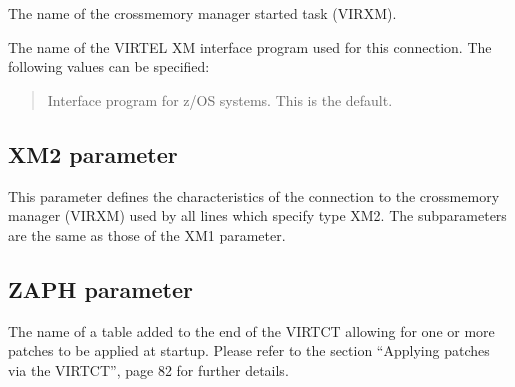\documentclass[letterpaper,10pt,english]{sphinxmanual}
\begin{document}
\sphinxAtStartPar
{} \sphinxhyphen{} The name of the cross\sphinxhyphen{}memory manager started task (VIRXM).

\sphinxAtStartPar
{} \sphinxhyphen{} The name of the VIRTEL XM interface program used for this connection. The following values can be specified:
\begin{quote}

\sphinxAtStartPar
{} \sphinxhyphen{} Interface program for z/OS systems. This is the default.
\end{quote}


\subsection{XM2 parameter}
\label{\detokenize{Installation_Guide:xm2-parameter}}
\begin{sphinxVerbatim}[commandchars=\\\{\}]
    
\PYG{p}{[}\PYG{p}{]}\PYG{p}{[}\PYG{p}{]}
\end{sphinxVerbatim}

\sphinxAtStartPar
This parameter defines the characteristics of the connection to the cross\sphinxhyphen{}memory manager (VIRXM) used by all lines which specify type XM2. The subparameters are the same as those of the XM1 parameter.

\ignorespaces 

\subsection{ZAPH parameter}
\label{\detokenize{Installation_Guide:zaph-parameter}}\label{\detokenize{Installation_Guide:index-144}}
\begin{sphinxVerbatim}[commandchars=\\\{\}]
 
\end{sphinxVerbatim}

\sphinxAtStartPar
{} \sphinxhyphen{} The name of a table added to the end of the VIRTCT allowing for one or more patches to be applied at startup. Please refer to the section “Applying patches via the VIRTCT”, page 82 for further details.
\end{document}
